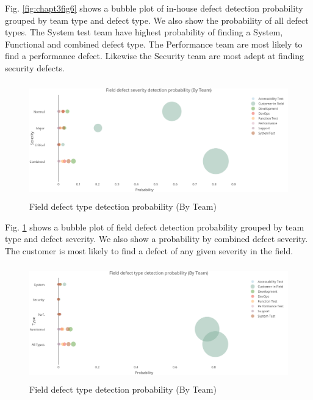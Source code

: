 Fig. \ref{fig:chapt3fig6} shows a bubble plot of in-house defect detection probability grouped by team type and defect type. We also show the probability of all defect types. The System test team have highest probability of finding a System, Functional and combined defect type. The Performance team are most likely to find a performance defect. Likewise the Security team are most adept at finding security defects. 

\begin{figure}
\begin{center}
\caption{Field defect type detection probability (By Team)}
\label{fig:chapt3fig7}
\includegraphics[height=5cm, width=12cm]{graphs/dogfood/Graph3.png} 
\end{center}
\end{figure}


Fig. \ref{fig:chapt3fig7} shows a bubble plot of field defect detection probability grouped by team type and defect severity. We also show a probability by combined defect severity. The customer is most likely to find a defect of any given severity in the field.

\begin{figure}
\begin{center}
\caption{Field defect type detection probability (By Team)}
\label{fig:chapt3fig8}
\includegraphics[height=5cm, width=12cm]{graphs/dogfood/Graph4.png} 
\end{center}
\end{figure}



